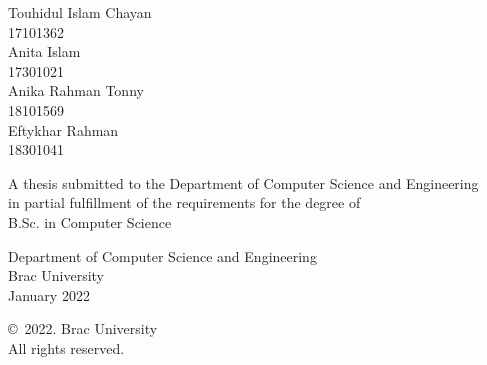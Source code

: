 \begin{titlepage}
\renewcommand*{\thepage}{Title} %

    \begin{center} 
        \vspace*{3cm} %
        
        {\fontsize{16pt}{22pt}\selectfont{Decipherable Classification of Glaucoma using\\
        Deep Neural Network Leveraging XAI}
        } %
        
        \vspace{1.5cm}
        
        
        \vspace{0.5cm}
        
        	Touhidul Islam Chayan\\
	        17101362\\
	        Anita Islam\\
	        17301021\\
	        Anika Rahman Tonny\\
	        18101569\\
	        Eftykhar Rahman\\
	        18301041

        \vspace{1.5cm}
        
        	A thesis submitted to the Department of Computer Science and Engineering\\
            in partial fulfillment of the requirements for the degree of\\
            B.Sc. in Computer Science

        
        \vspace{2.5cm}
        
    		Department of Computer Science and Engineering\\
            Brac University\\
            January 2022
        
        \vspace{3cm}
        
    		\copyright\ 2022. Brac University\\
            All rights reserved.
    
    \end{center}

\end{titlepage}